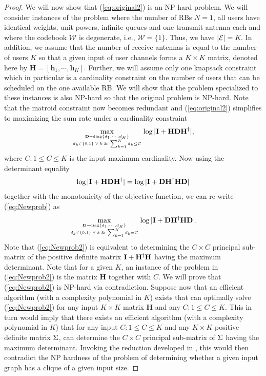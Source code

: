 \documentclass[11pt] {article}
\newcommand{\uwti}[1]{{\mathbf #1}}
\newcommand{\hb}{{\uwti h}}  \newcommand{\Hb}{{\uwti H}}
\newcommand{\Wc} {{\mathcal W}}         \newcommand{\Wk} {{\bm {\mathcal W}}}
\newcommand{\Eulc} {{\underline{\mathcal E}}}
\begin{document}
\begin{proof}
We will now show that (\ref{eq:original2}) is an NP hard problem.
We will consider instances of the problem where the number of RBs $N=1$,  all users have identical weights, unit powers, infinite queues and one transmit antenna each and where the codebook $\Wc$ is degenerate, i.e., $\Wc=\{1\}$.  Thus, we have $|\Eulc|=K$. In addition, we assume that the number of receive antennas is equal to the number of users $K$ so that a given  input of user channels forms a $K\times K$ matrix, denoted here by $\Hb=[\hb_1,\cdots,\hb_K]$. Further, we will assume only one knapsack constraint which in particular is a cardinality constraint on the number of users that can be scheduled on the one available RB. We will show that the problem specialized to these instances is also NP-hard so that the original problem is NP-hard.
Note that the matroid constraint now becomes redundant and (\ref{eq:original2}) simplifies to  maximizing the sum rate under a cardinality constraint
\begin{eqnarray}\label{eq:Newprob}
   \max_{\Db=\diag\{d_1,\cdots,d_K\}\atop d_k\in\{0,1\}\;\forall\;k \;\&\;\sum_{k=1}^K d_k\leq C}\log|\Ib+\Hb\Db\Hb^{\dag}|,
   \end{eqnarray}
where $C:1\leq C\leq K$ is the input maximum cardinality.
Now using the determinant equality
\begin{eqnarray}
   \log|\Ib+\Hb\Db\Hb^{\dag}|= \log|\Ib+\Db\Hb^{\dag}\Hb\Db|
   \end{eqnarray}
together with the monotonicity of the objective function, we can re-write (\ref{eq:Newprob}) as
\begin{eqnarray}\label{eq:Newprob2}
   \max_{\Db=\diag\{d_1,\cdots,d_K\}\atop d_k\in\{0,1\}\;\forall\;k \;\&\;\sum_{k=1}^K d_k= C}\log |\Ib+\Db\Hb^{\dag}\Hb\Db|.
   \end{eqnarray}
   Note that (\ref{eq:Newprob2}) is equivalent to determining the $C\times C$ principal sub-matrix of the positive definite matrix $\Ib+\Hb^{\dag}\Hb$ having the maximum determinant. Note that for a given $K$, an instance of the problem in (\ref{eq:Newprob2}) is the matrix $\Hb$ together with $C$. We will prove that (\ref{eq:Newprob2}) is NP-hard via contradiction.
Suppose now that an efficient algorithm (with a complexity polynomial in $K$) exists that can optimally solve (\ref{eq:Newprob2}) for any input $K\times K$ matrix $\Hb$ and any $C:1\leq C\leq K$.
This in turn would imply that there exists an efficient algorithm (with a complexity polynomial in $K$)
that for any input $C:1\leq C\leq K$ and any   $K\times K$ positive definite matrix $\Sigmab$, can determine the  $C\times C$ principal sub-matrix  of $\Sigmab$  having the maximum determinant. Invoking the reduction developed in \cite{ko:algo}, this would then contradict the NP hardness of the problem of determining whether a given input graph has a clique of a given input size.\end{proof}
\end{document}
